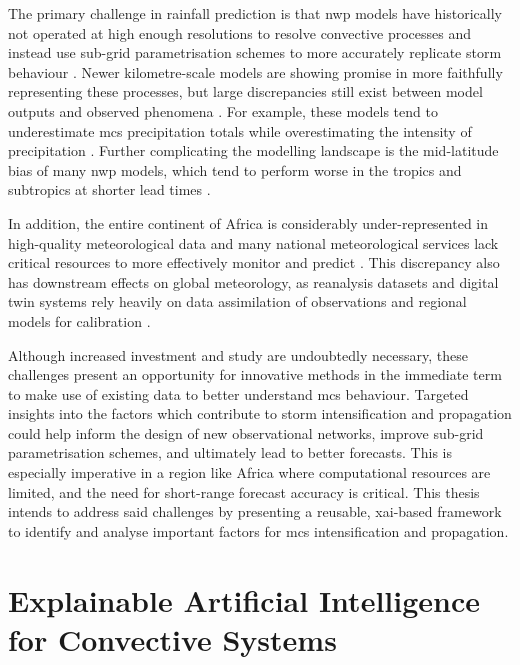 The primary challenge in rainfall prediction is that \acrfull{nwp} models have historically not operated at high enough resolutions to resolve convective processes and instead use sub-grid parametrisation schemes to more accurately replicate storm behaviour \citep{Stevens2019,Yano2018}. Newer kilometre-scale models are showing promise in more faithfully representing these processes, but large discrepancies still exist between model outputs and observed phenomena \citep{Feng2025,Yano2018}. For example, these models tend to underestimate \acrshort{mcs} precipitation totals while overestimating the intensity of precipitation \citep{Feng2025,Stevens2019}. Further complicating the modelling landscape is the mid-latitude bias of many \acrshort{nwp} models, which tend to perform worse in the tropics and subtropics at shorter lead times \citep{Keane2025}. 

In addition, the entire continent of Africa is considerably under-represented in high-quality meteorological data and many national meteorological services lack critical resources to more effectively monitor and predict  \citep{Dinku2019,Kinyondo2018,Meque2021}. This discrepancy also has downstream effects on global meteorology, as reanalysis datasets and digital twin systems rely heavily on data assimilation of observations and regional models for calibration \citep{Linsenmeier2023,Valmassoi2023}. 

Although increased investment and study are undoubtedly necessary, these challenges present an opportunity for innovative methods in the immediate term to make use of existing data to better understand \acrshort{mcs} behaviour. Targeted insights into the factors which contribute to storm intensification and propagation could help inform the design of new observational networks, improve sub-grid parametrisation schemes, and ultimately lead to better forecasts. This is especially imperative in a region like Africa where computational resources are limited, and the need for short-range forecast accuracy is critical. This thesis intends to address said challenges by presenting a reusable, \acrfull{xai}-based framework to identify and analyse important factors for \acrshort{mcs} intensification and propagation.

\section{Explainable Artificial Intelligence for Convective Systems}

